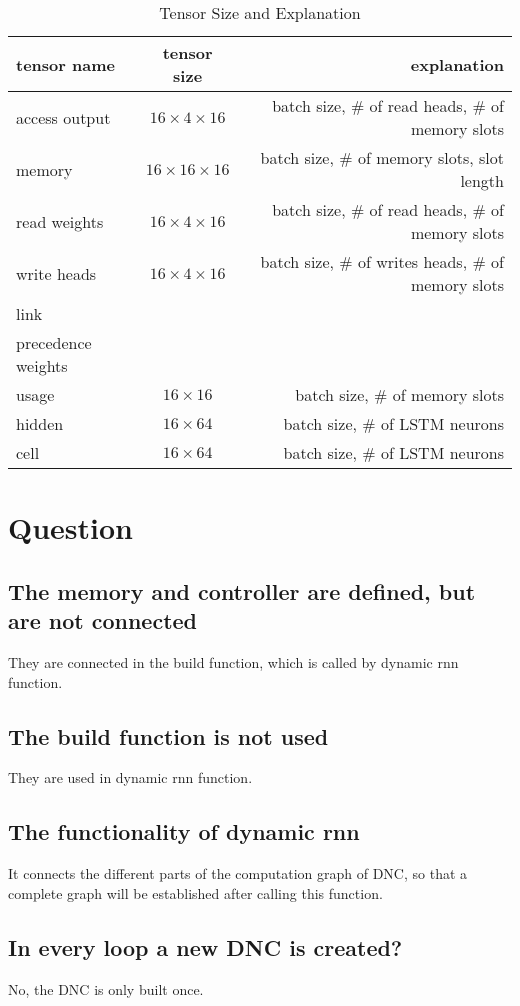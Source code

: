 \documentclass{article}
\begin{document}
\begin{table}
\centering
\caption{Tensor Size and Explanation}
\begin{tabular}{| l | c | r |} \hline
tensor name & tensor size & explanation \\ \hline
access output & $16\times4\times16$ & batch size, $\#$ of read heads, $\#$ of memory slots \\ \hline
memory & $16\times16\times16$ & batch size, $\#$ of memory slots, slot length \\ \hline
read weights & $16\times4\times16$ & batch size, $\#$ of read heads, $\#$ of memory slots \\ \hline
write heads & $16\times4\times16$ & batch size, $\#$ of writes heads, $\#$ of memory slots \\ \hline
link  &   &   \\ \hline
precedence weights  &   &   \\ \hline
usage  & $16\times16$  & batch size, $\#$ of memory slots \\ \hline
hidden  & $16\times64$  & batch size, $\#$ of LSTM neurons \\ \hline
cell  & $16\times64$  & batch size, $\#$ of LSTM neurons \\ \hline
\end{tabular}
\end{table}

\section{Question}
\subsection{The memory and controller are defined, but are not connected}
They are connected in the build function, which is called by dynamic rnn function.
\subsection{The build function is not used}
They are used in dynamic rnn function.
\subsection{The functionality of dynamic rnn}
It connects the different parts of the computation graph of DNC, so that a complete graph will be established after calling this function.
\subsection{In every loop a new DNC is created?}
No, the DNC is only built once. 
\end{document}

